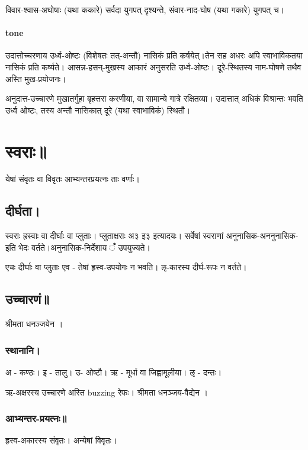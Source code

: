 \documentclass[oneside, article]{memoir}
\begin{document}
विवार-श्वास-अघोषाः (यथा ककारे) सर्वदा युगपत् दृश्यन्ते, संवार-नाद-घोष (यथा गकारे) युगपत् च।

\paragraph{tone}
उदात्तोच्चरणाय उर्ध्व-ओष्टः (विशेषतः तत्-अन्तौ) नासिकं प्रति कर्षयेत्।तेन सह अधरः अपि स्वाभाविकतया नासिकं प्रति कर्ष्यते। आसन्न-हसन्-मुखस्य आकारं अनुसरति उर्ध्व-ओष्टः। दूरे-स्थितस्य नाम-घोषणे तथैव अस्ति मुख-प्रयोजनः।

अनुदात्त-उच्चारणे मुखातर्गुहा बृहत्तरा करणीया, वा सामान्ये गात्रे रक्षितव्या। उदात्तात् अधिकं विश्रान्तः भवति उर्ध्व ओष्टः, तस्य अन्तौ नासिकात् दूरे (यथा स्वाभाविकं) स्थितौ।

\section{स्वराः॥}
येषां संवृतः वा विवृतः आभ्यन्तरप्रयत्नः ताः वर्णाः।

\subsection{दीर्घता।}
स्वराः ह्रस्वाः वा दीर्घाः वा प्लुताः। प्लुताक्षराः अ३ इ३ इत्यादयः। सर्वेषां स्वराणां‌ अनुनासिक-अननुनासिक-इति भेदः वर्तते।अनुनासिक-निर्देशाय ँ उपयुज्यते।

एचः दीर्घाः वा प्लुताः एव - तेषां ह्रस्व-उपयोगः न भवति। ऌ-कारस्य दीर्घ-रूपः न वर्तते।


\subsection{उच्चारणं॥}
श्रीमता धनञ्जयेन ।


\subsubsection{स्थानानि।}
अ - कण्ठः। इ - तालु। उ- ओष्टौ। ऋ - मूर्धा वा जिह्वामूलीया। ऌ - दन्तः।

ऋ-अक्षरस्य उच्चारणे अस्ति buzzing रेफः। श्रीमता धनञ्जय-वैद्येन ।

\subsubsection{आभ्यन्तर-प्रयत्नः॥}
ह्रस्व-अकारस्य संवृतः। अन्येषां विवृतः।
\end{document}
